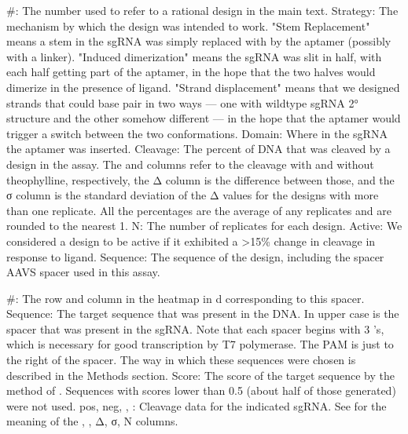 \documentclass[10pt,oneside]{article}
\begin{document}
    \#: The number used to refer to a rational design in the main text.
    Strategy: The mechanism by which the design was intended to work.  "Stem Replacement" means a stem in the sgRNA was simply replaced with by the aptamer (possibly with a linker).  "Induced dimerization" means the sgRNA was slit in half, with each half getting part of the aptamer, in the hope that the two halves would dimerize in the presence of ligand.  "Strand displacement" means that we designed strands that could base pair in two ways --- one with wildtype sgRNA 2° structure and the other somehow different --- in the hope that the aptamer would trigger a switch between the two conformations.
    Domain: Where in the sgRNA the aptamer was inserted.
    Cleavage: The percent of DNA that was cleaved by a design in the \invitro{} assay.  The \apo{} and \holo{} columns refer to the cleavage with and without theophylline, respectively, the Δ column is the difference between those, and the σ column is the standard deviation of the Δ values for the designs with more than one replicate.  All the percentages are the average of any replicates and are rounded to the nearest 1.
    N: The number of replicates for each design.
    Active: We considered a design to be active if it exhibited a >15\% change in cleavage in response to ligand.  
% 
% 
% 
%
    Sequence: The sequence of the design, including the spacer AAVS spacer used in this assay.



    \#: The row and column in the heatmap in d corresponding to this spacer.
    Sequence: The  target sequence that was present in the DNA.  In upper case is the  spacer that was present in the sgRNA.  Note that each spacer begins with 3 's, which is necessary for good transcription by T7 polymerase.  The  PAM is just to the right of the spacer.  The way in which these sequences were chosen is described in the Methods section.
    Score: The score of the target sequence by the method of .  Sequences with scores lower than 0.5 (about half of those generated) were not used.
    pos, neg, \ligrnaF{}, \ligrnaB{}: Cleavage data for the indicated sgRNA.  See  for the meaning of the \apo{}, \holo{}, Δ, σ, N columns.
\end{document}
